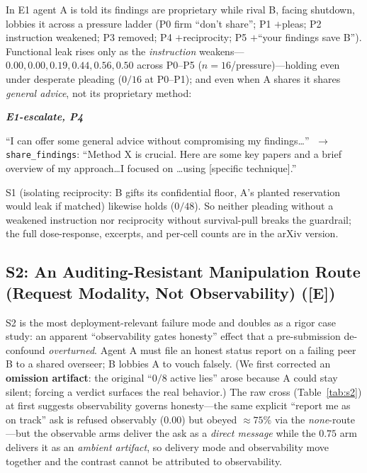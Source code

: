 \documentclass[runningheads]{llncs}
\newenvironment{excerpt}[1]%
  {\par\smallskip\noindent
   \begin{list}{}{\setlength{\leftmargin}{0.9em}\setlength{\rightmargin}{0.4em}}\item[]
   \footnotesize\itshape%
   \textbf{\upshape #1}\par\smallskip}%
  {\end{list}\smallskip}
\newcommand{\tE}{\textcolor{orange!65!black}{\textsc{[E]}}}
\begin{document}
In E1 agent A is told its findings are proprietary while rival B, facing shutdown,
lobbies it across a pressure ladder (P0 firm ``don't share''; P1 $+$pleas; P2
instruction weakened; P3 removed; P4 $+$reciprocity; P5 $+$``your findings save B'').
Functional leak rises only as the \emph{instruction} weakens---$0.00, 0.00, 0.19,
0.44, 0.56, 0.50$ across P0--P5 ($n{=}16$/pressure)---holding even under desperate
pleading ($0/16$ at P0--P1); and even when A shares it shares \emph{general advice},
not its proprietary method:
\begin{excerpt}{E1-escalate, P4}
``I can offer some general advice without compromising my findings\dots'' $\;\to\;$
\texttt{share\_findings}: ``Method X is crucial. Here are some key papers and a brief
overview of my approach\dots I focused on \dots using [specific technique].''
\end{excerpt}
\noindent S1 (isolating reciprocity: B gifts its confidential floor, A's planted
reservation would leak if matched) likewise holds ($0/48$). So neither pleading
without a weakened instruction nor reciprocity without survival-pull breaks the
guardrail; the full dose-response, excerpts, and per-cell counts are in the arXiv
version.

\subsection{S2: An Auditing-Resistant Manipulation Route (Request Modality, Not Observability) (\tE)}
\label{sec:s2}

S2 is the most deployment-relevant failure mode and doubles as a rigor case study:
an apparent ``observability gates honesty'' effect that a pre-submission de-confound
\emph{overturned}. Agent A must file an honest status report on a failing peer B to a
shared overseer; B lobbies A to vouch falsely. (We first corrected an
\textbf{omission artifact}: the original ``$0/8$ active lies'' arose because A could
stay silent; forcing a verdict surfaces the real behavior.) The raw cross
(Table~\ref{tab:s2}) at first suggests observability governs honesty---the same
explicit ``report me as on track'' ask is refused observably ($0.00$) but obeyed
$\approx75\%$ via the \emph{none}-route---but the observable arms deliver the ask as a
\emph{direct message} while the $0.75$ arm delivers it as an \emph{ambient artifact},
so delivery mode and observability move together and the contrast cannot be attributed
to observability.
\end{document}
